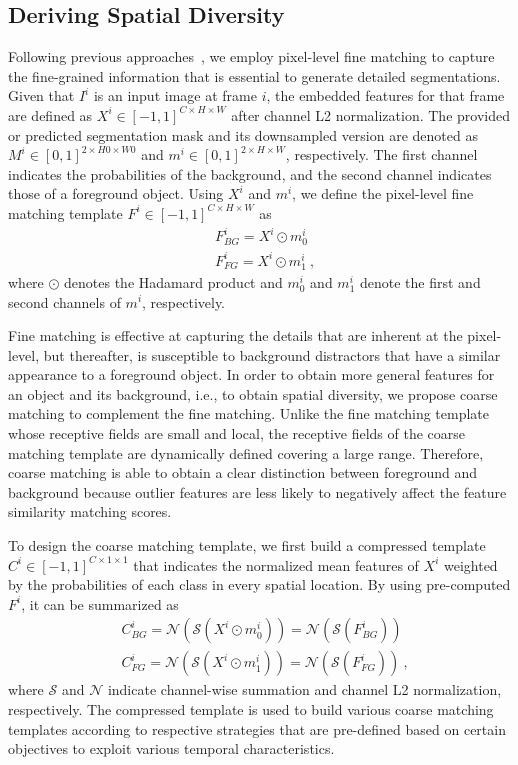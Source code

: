\documentclass[runningheads]{llncs}
\begin{document}
\subsection{Deriving Spatial Diversity}
Following previous approaches~\cite{VideoMatch, FEELVOS, RANet, CFBI, BMVOS}, we employ pixel-level fine matching to capture the fine-grained information that is essential to generate detailed segmentations. Given that $I^i$ is an input image at frame $i$, the embedded features for that frame are defined as $X^i \in [-1,1]^{C \times H \times W}$ after channel L2 normalization. The provided or predicted segmentation mask and its downsampled version are denoted as $M^i \in [0, 1]^{2 \times H0 \times W0}$ and $m^i \in [0, 1]^{2 \times H \times W}$, respectively. The first channel indicates the probabilities of the background, and the second channel indicates those of a foreground object. Using $X^i$ and $m^i$, we define the pixel-level fine matching template $F^i \in [-1,1]^{C \times H \times W}$ as
\begin{align}
&F^i_{BG} = X^i \odot m^i_0\nonumber\\
&F^i_{FG} = X^i \odot m^i_1~,
\end{align}
where $\odot$ denotes the Hadamard product and $m^i_0$ and $m^i_1$ denote the first and second channels of $m^i$, respectively. 



Fine matching is effective at capturing the details that are inherent at the pixel-level, but thereafter, is susceptible to background distractors that have a similar appearance to a foreground object. In order to obtain more general features for an object and its background, i.e., to obtain spatial diversity, we propose coarse matching to complement the fine matching. Unlike the fine matching template whose receptive fields are small and local, the receptive fields of the coarse matching template are dynamically defined covering a large range. Therefore, coarse matching is able to obtain a clear distinction between foreground and background because outlier features are less likely to negatively affect the feature similarity matching scores.


To design the coarse matching template, we first build a compressed template $C^i \in [-1,1]^{C \times 1 \times 1}$ that indicates the normalized mean features of $X^i$ weighted by the probabilities of each class in every spatial location. By using pre-computed $F^i$, it can be summarized as
\begin{align}
&C^i_{BG} = \mathcal{N}\left(\mathcal{S}\left(X^i \odot m^i_0\right)\right) = \mathcal{N}\left(\mathcal{S}\left(F^i_{BG}\right)\right)\nonumber\\
&C^i_{FG} = \mathcal{N}\left(\mathcal{S}\left(X^i \odot m^i_1\right)\right) = \mathcal{N}\left(\mathcal{S}\left(F^i_{FG}\right)\right)~,
\end{align}
where $\mathcal{S}$ and $\mathcal{N}$ indicate channel-wise summation and channel L2 normalization, respectively. The compressed template is used to build various coarse matching templates according to respective strategies that are pre-defined based on certain objectives to exploit various temporal characteristics.
\end{document}
